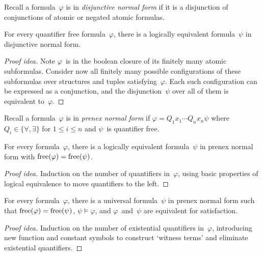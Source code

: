 \noindent Recall a formula~\(\varphi\) is in \emph{disjunctive normal form} if it is a disjunction of conjunctions of atomic or negated atomic formulas.

\begin{thm}
For every quantifier free formula~\(\varphi\), there is a logically equivalent formula~\(\psi\) in disjunctive normal form.
\end{thm}
\begin{proof}[Proof idea]
Note \(\varphi\)~is in the boolean closure of its finitely many atomic subformulas. Consider now all finitely many possible configurations of these subformulas over structures and tuples satisfying~\(\varphi\). Each such configuration can be expressed as a conjunction, and the disjunction~\(\psi\) over all of them is equivalent to~\(\varphi\).
\end{proof}

\noindent Recall a formula~\(\varphi\) is in \emph{prenex normal form} if \(\varphi=Q_1 x_1\cdots Q_n x_n\psi\) where \(Q_i\in\{\forall,\exists\}\) for \(1\le i\le n\) and \(\psi\)~is quantifier free.

\begin{thm}
For every formula~\(\varphi\), there is a logically equivalent formula~\(\psi\) in prenex normal form with \(\operatorname{free}(\varphi)=\operatorname{free}(\psi)\).
\end{thm}
\begin{proof}[Proof idea]
Induction on the number of quantifiers in~\(\varphi\), using basic properties of logical equivalence to move quantifiers to the left.
\end{proof}

\begin{thm}
For every formula~\(\varphi\), there is a universal formula~\(\psi\) in prenex normal form such that \(\operatorname{free}(\varphi)=\operatorname{free}(\psi)\), \(\psi\models\varphi\), and \(\varphi\)~and~\(\psi\) are equivalent for satisfaction.
\end{thm}
\begin{proof}[Proof idea]
Induction on the number of existential quantifiers in~\(\varphi\), introducing new function and constant symbols to construct `witness terms' and eliminate existential quantifiers.
\end{proof}
